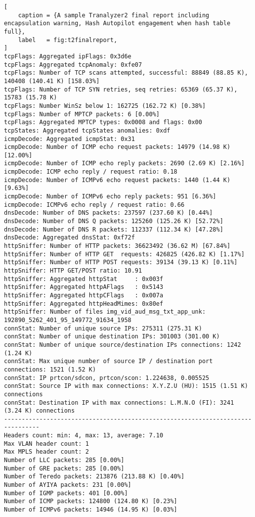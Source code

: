 \begin{lstlisting}[
    caption = {A sample Tranalyzer2 final report including encapsulation warning, Hash Autopilot engagement when hash table full},
    label   = fig:t2finalreport,
]
tcpFlags: Aggregated ipFlags: 0x3d6e
tcpFlags: Aggregated tcpAnomaly: 0xfe07
tcpFlags: Number of TCP scans attempted, successful: 88849 (88.85 K), 140408 (140.41 K) [158.03%]
tcpFlags: Number of TCP SYN retries, seq retries: 65369 (65.37 K), 15783 (15.78 K)
tcpFlags: Number WinSz below 1: 162725 (162.72 K) [0.38%]
tcpFlags: Number of MPTCP packets: 6 [0.00%]
tcpFlags: Aggregated MPTCP types: 0x0008 and flags: 0x00
tcpStates: Aggregated tcpStates anomalies: 0xdf
icmpDecode: Aggregated icmpStat: 0x31
icmpDecode: Number of ICMP echo request packets: 14979 (14.98 K) [12.00%]
icmpDecode: Number of ICMP echo reply packets: 2690 (2.69 K) [2.16%]
icmpDecode: ICMP echo reply / request ratio: 0.18
icmpDecode: Number of ICMPv6 echo request packets: 1440 (1.44 K) [9.63%]
icmpDecode: Number of ICMPv6 echo reply packets: 951 [6.36%]
icmpDecode: ICMPv6 echo reply / request ratio: 0.66
dnsDecode: Number of DNS packets: 237597 (237.60 K) [0.44%]
dnsDecode: Number of DNS Q packets: 125260 (125.26 K) [52.72%]
dnsDecode: Number of DNS R packets: 112337 (112.34 K) [47.28%]
dnsDecode: Aggregated dnsStat: 0xf72f
httpSniffer: Number of HTTP packets: 36623492 (36.62 M) [67.84%]
httpSniffer: Number of HTTP GET  requests: 426825 (426.82 K) [1.17%]
httpSniffer: Number of HTTP POST requests: 39134 (39.13 K) [0.11%]
httpSniffer: HTTP GET/POST ratio: 10.91
httpSniffer: Aggregated httpStat     : 0x003f
httpSniffer: Aggregated httpAFlags   : 0x5143
httpSniffer: Aggregated httpCFlags   : 0x007a
httpSniffer: Aggregated httpHeadMimes: 0x80ef
httpSniffer: Number of files img_vid_aud_msg_txt_app_unk: 192890_5262_401_95_149772_91634_1958
connStat: Number of unique source IPs: 275311 (275.31 K)
connStat: Number of unique destination IPs: 301003 (301.00 K)
connStat: Number of unique source/destination IPs connections: 1242 (1.24 K)
connStat: Max unique number of source IP / destination port connections: 1521 (1.52 K)
connStat: IP prtcon/sdcon, prtcon/scon: 1.224638, 0.005525
connStat: Source IP with max connections: X.Y.Z.U (HU): 1515 (1.51 K) connections
connStat: Destination IP with max connections: L.M.N.O (FI): 3241 (3.24 K) connections
--------------------------------------------------------------------------------
Headers count: min: 4, max: 13, average: 7.10
Max VLAN header count: 1
Max MPLS header count: 2
Number of LLC packets: 285 [0.00%]
Number of GRE packets: 285 [0.00%]
Number of Teredo packets: 213876 (213.88 K) [0.40%]
Number of AYIYA packets: 231 [0.00%]
Number of IGMP packets: 401 [0.00%]
Number of ICMP packets: 124800 (124.80 K) [0.23%]
Number of ICMPv6 packets: 14946 (14.95 K) [0.03%]

\end{lstlisting}

